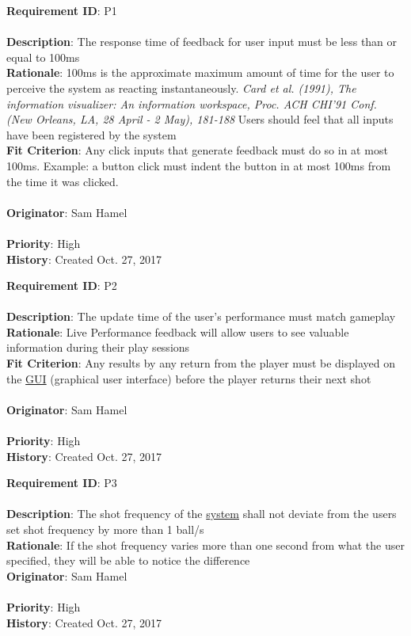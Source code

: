 \documentclass[11pt]{article}
\begin{document}
\begin{framed}
	\noindent\textbf{Requirement ID}: P1 \hfill\\\\
	\noindent\textbf{Description}: The response time of feedback for user input must be less than or equal to 100ms \\
	\textbf{Rationale}: 100ms is the approximate maximum amount of time for the user to perceive the system as reacting instantaneously. 
    \textit{Card et al. (1991), The information visualizer: An information workspace, Proc. ACH CHI'91 Conf. (New Orleans, LA, 28 April - 2 May), 181-188} Users should feel that all inputs have been registered by the system\\
	\textbf{Fit Criterion}: Any click inputs that generate feedback must do so in at most 100ms. Example: a button click must indent the button in at most 100ms from the time it was clicked.  \\\\
	\textbf{Originator}: Sam Hamel \\\\
	\textbf{Priority}: High \hfill \\
	\noindent\textbf{History}: Created Oct. 27, 2017
\end{framed}

\begin{framed}
	\noindent\textbf{Requirement ID}: P2 \hfill\\\\
	\noindent\textbf{Description}: The update time of the user's performance must match gameplay  \\
	\textbf{Rationale}: Live Performance feedback will allow users to see valuable information during their play sessions \\
	\textbf{Fit Criterion}: Any results by any return from the player must be displayed on the \hyperref[sec:definitions]{GUI} (graphical user interface) before the player returns their next shot  \\\\
	\textbf{Originator}: Sam Hamel \\\\
	\textbf{Priority}: High \hfill \\
	\noindent\textbf{History}: Created Oct. 27, 2017
\end{framed}

\begin{framed}
	\noindent\textbf{Requirement ID}: P3 \hfill\\\\
	\noindent\textbf{Description}: The shot frequency of the \hyperref[sec:definitions]{system} shall not deviate from the users set shot frequency by more than 1 ball/s  \\
	\textbf{Rationale}: If the shot frequency varies more than one second from what the user specified, they will be able to notice the difference \\
	\textbf{Originator}: Sam Hamel \\\\
	\textbf{Priority}: High \hfill \\
	\noindent\textbf{History}: Created Oct. 27, 2017
\end{framed}
\end{document}
